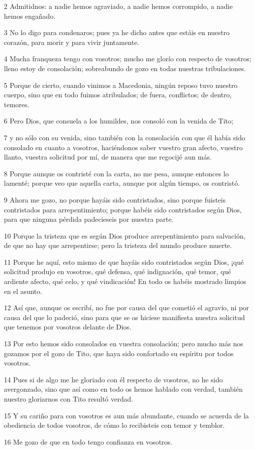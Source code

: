 \par 2 Admitidnos: a nadie hemos agraviado, a nadie hemos corrompido, a nadie hemos engañado.
\par 3 No lo digo para condenaros; pues ya he dicho antes que estáis en nuestro corazón, para morir y para vivir juntamente.
\par 4 Mucha franqueza tengo con vosotros; mucho me glorío con respecto de vosotros; lleno estoy de consolación; sobreabundo de gozo en todas nuestras tribulaciones.
\par 5 Porque de cierto, cuando vinimos a Macedonia, ningún reposo tuvo nuestro cuerpo, sino que en todo fuimos atribulados; de fuera, conflictos; de dentro, temores.
\par 6 Pero Dios, que consuela a los humildes, nos consoló con la venida de Tito;
\par 7 y no sólo con su venida, sino también con la consolación con que él había sido consolado en cuanto a vosotros, haciéndonos saber vuestro gran afecto, vuestro llanto, vuestra solicitud por mí, de manera que me regocijé aun más.
\par 8 Porque aunque os contristé con la carta, no me pesa, aunque entonces lo lamenté; porque veo que aquella carta, aunque por algún tiempo, os contristó.
\par 9 Ahora me gozo, no porque hayáis sido contristados, sino porque fuisteis contristados para arrepentimiento; porque habéis sido contristados según Dios, para que ninguna pérdida padecieseis por nuestra parte.
\par 10 Porque la tristeza que es según Dios produce arrepentimiento para salvación, de que no hay que arrepentirse; pero la tristeza del mundo produce muerte.
\par 11 Porque he aquí, esto mismo de que hayáis sido contristados según Dios, ¡qué solicitud produjo en vosotros, qué defensa, qué indignación, qué temor, qué ardiente afecto, qué celo, y qué vindicación! En todo os habéis mostrado limpios en el asunto.
\par 12 Así que, aunque os escribí, no fue por causa del que cometió el agravio, ni por causa del que lo padeció, sino para que se os hiciese manifiesta nuestra solicitud que tenemos por vosotros delante de Dios.
\par 13 Por esto hemos sido consolados en vuestra consolación; pero mucho más nos gozamos por el gozo de Tito, que haya sido confortado su espíritu por todos vosotros.
\par 14 Pues si de algo me he gloriado con él respecto de vosotros, no he sido avergonzado, sino que así como en todo os hemos hablado con verdad, también nuestro gloriarnos con Tito resultó verdad.
\par 15 Y su cariño para con vosotros es aun más abundante, cuando se acuerda de la obediencia de todos vosotros, de cómo lo recibisteis con temor y temblor.
\par 16 Me gozo de que en todo tengo confianza en vosotros.

